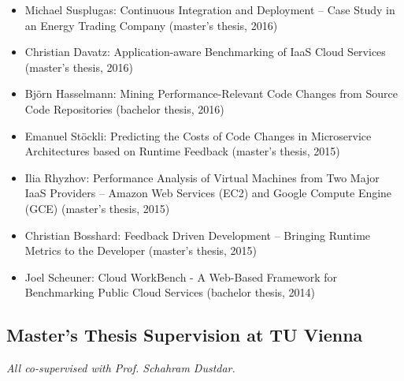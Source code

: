 \documentclass[paper=letter,fontsize=11pt]{scrartcl} %
\begin{document}
\begin{itemize}
  \item Michael Susplugas: Continuous Integration and Deployment -- Case Study in an Energy Trading Company (master's thesis, 2016)
	\item Christian Davatz: Application-aware Benchmarking of IaaS Cloud Services (master's thesis, 2016)
	\item Bj\"orn Hasselmann: Mining Performance-Relevant Code Changes from Source Code Repositories (bachelor thesis, 2016)
  \item Emanuel St\"ockli: Predicting the Costs of Code Changes in Microservice Architectures based on Runtime Feedback  (master's thesis, 2015)
  \item Ilia Rhyzhov: Performance Analysis of Virtual Machines from Two Major IaaS Providers -- Amazon Web Services (EC2) and Google Compute Engine (GCE)  (master's thesis, 2015)
  \item Christian Bosshard: Feedback Driven Development -- Bringing Runtime Metrics to the Developer  (master's thesis, 2015)
  \item Joel Scheuner: Cloud WorkBench - A Web-Based Framework for Benchmarking Public Cloud Services (bachelor thesis, 2014)
\end{itemize}

\subsection*{Master's Thesis Supervision at TU Vienna}

\emph{All co-supervised with Prof. Schahram Dustdar.}
\end{document}
